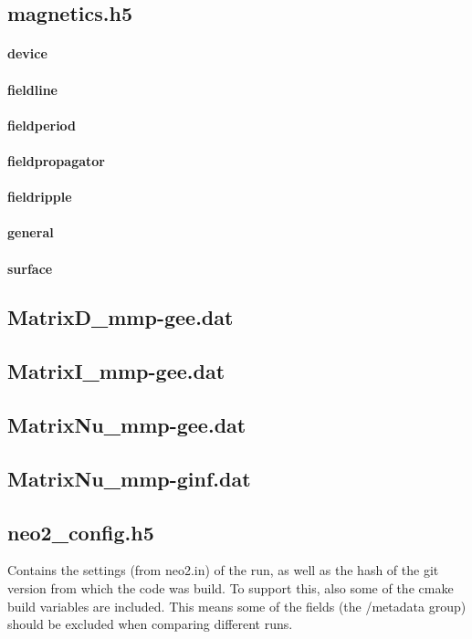 \subsection{magnetics.h5}
\paragraph{device}
\paragraph{fieldline}
\paragraph{fieldperiod}
\paragraph{fieldpropagator}
\paragraph{fieldripple}
\paragraph{general}
\paragraph{surface}

\subsection{MatrixD\_mmp-gee.dat}
\subsection{MatrixI\_mmp-gee.dat}
\subsection{MatrixNu\_mmp-gee.dat}
\subsection{MatrixNu\_mmp-ginf.dat}

\subsection{neo2\_config.h5}
Contains the settings (from neo2.in) of the run, as well as the hash of
the git version from which the code was build. To support this, also
some of the cmake build variables are included.
This means some of the fields (the /metadata group) should be
excluded when comparing different runs.

